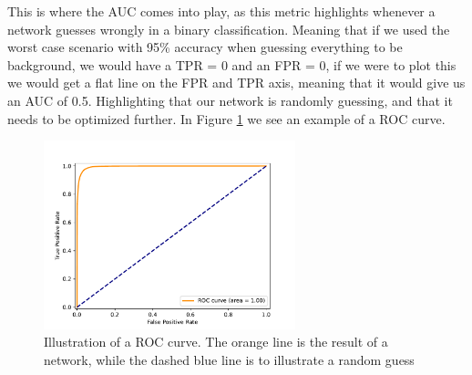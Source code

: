 \documentclass[12pt, a4paper]{book}
\begin{document}
This is where the AUC comes into play, as this metric highlights whenever a network guesses wrongly in a binary classification. Meaning that if we used the worst case scenario with 95\% accuracy when guessing everything to be background, we would have a TPR = 0 and an FPR = 0, 
if we were to plot this we would get a flat line on the FPR and TPR axis, meaning that it would give us an AUC of 0.5. Highlighting that our network is randomly guessing, and that it needs to be optimized further. In Figure \ref{fig:ROC} we see an example of a ROC curve.
\graphicspath{{../../../Plots/Plot_types/}}
\begin{figure}[!ht]
	\centering
    \includegraphics[width=0.65\textwidth]{ROC.pdf}
    \caption[ROC curve illustration]{Illustration of a ROC curve. The orange line is the result of a network, while the dashed blue line is to illustrate a random guess}\label{fig:ROC}
\end{figure}
\end{document}
